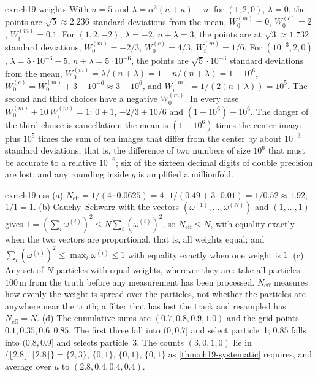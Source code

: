 \begin{solution}{exr:ch19-weights}
With $n = 5$ and $\lambda = \alpha^2(n + \kappa) - n$: for $(1, 2, 0)$, $\lambda = 0$, the points are $\sqrt{5} \approx 2.236$ standard deviations from the mean, $W_0^{(m)} = 0$, $W_0^{(c)} = 2$, $W_i^{(m)} = 0.1$. For $(1, 2, -2)$, $\lambda = -2$, $n + \lambda = 3$, the points are at $\sqrt{3} \approx 1.732$ standard deviations, $W_0^{(m)} = -2/3$, $W_0^{(c)} = 4/3$, $W_i^{(m)} = 1/6$. For $(10^{-3}, 2, 0)$, $\lambda = 5 \cdot 10^{-6} - 5$, $n + \lambda = 5 \cdot 10^{-6}$, the points are $\sqrt{5} \cdot 10^{-3}$ standard deviations from the mean, $W_0^{(m)} = \lambda/(n + \lambda) = 1 - n/(n + \lambda) = 1 - 10^6$, $W_0^{(c)} = W_0^{(m)} + 3 - 10^{-6} \approx 3 - 10^6$, and $W_i^{(m)} = 1/(2(n + \lambda)) = 10^5$. The second and third choices have a negative $W_0^{(m)}$. In every case $W_0^{(m)} + 10\,W_i^{(m)} = 1$: $0 + 1$, $-2/3 + 10/6$ and $(1 - 10^6) + 10^6$. The danger of the third choice is cancellation: the mean is $(1 - 10^6)$ times the center image plus $10^5$ times the sum of ten images that differ from the center by about $10^{-3}$ standard deviations, that is, the difference of two numbers of size $10^6$ that must be accurate to a relative $10^{-6}$; six of the sixteen decimal digits of double precision are lost, and any rounding inside $g$ is amplified a millionfold.
\end{solution}

\begin{solution}{exr:ch19-ess}
(a) $N_{\mathrm{eff}} = 1/(4 \cdot 0.0625) = 4$; $1/(0.49 + 3 \cdot 0.01) = 1/0.52 \approx 1.92$; $1/1 = 1$. (b) Cauchy--Schwarz with the vectors $(\omega^{(1)}, \dots, \omega^{(N)})$ and $(1, \dots, 1)$ gives $1 = (\sum_i \omega^{(i)})^2 \le N \sum_i (\omega^{(i)})^2$, so $N_{\mathrm{eff}} \le N$, with equality exactly when the two vectors are proportional, that is, all weights equal; and $\sum_i (\omega^{(i)})^2 \le \max_i \omega^{(i)} \le 1$ with equality exactly when one weight is $1$. (c) Any set of $N$ particles with equal weights, wherever they are: take all particles $100\,\mathrm{m}$ from the truth before any measurement has been processed. $N_{\mathrm{eff}}$ measures how evenly the weight is spread over the particles, not whether the particles are anywhere near the truth; a filter that has lost the track and resampled has $N_{\mathrm{eff}} = N$. (d) The cumulative sums are $(0.7, 0.8, 0.9, 1.0)$ and the grid points $0.1, 0.35, 0.6, 0.85$. The first three fall into $(0, 0.7]$ and select particle~1; $0.85$ falls into $(0.8, 0.9]$ and selects particle~3. The counts $(3, 0, 1, 0)$ lie in $\{\lfloor 2.8 \rfloor, \lceil 2.8 \rceil\} = \{2, 3\}$, $\{0, 1\}$, $\{0, 1\}$, $\{0, 1\}$ as \cref{thm:ch19-systematic} requires, and average over $u$ to $(2.8, 0.4, 0.4, 0.4)$.
\end{solution}

